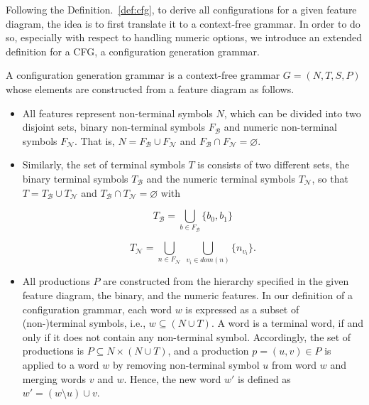 Following the Definition.~\ref{def:cfg}, to derive all configurations for a
given feature diagram, the idea is to first translate it to a context-free
grammar. In order to do so, especially with respect to handling numeric
options, we introduce an extended definition for a CFG, a configuration
generation grammar.

\begin{definition}\label{def:cgg}
A configuration generation grammar is a context-free grammar $G = (N, T, S,
P)$ whose elements are constructed from a feature diagram as follows.

\begin{itemize}
  \item All features represent non-terminal symbols $N$, which can be divided
  into two disjoint sets, binary non-terminal symbols $F_\mathcal{B}$ and
  numeric non-terminal symbols $F_\mathcal{N}$. That is, $N = F_\mathcal{B}
  \cup F_\mathcal{N}$ and $F_\mathcal{B} \cap F_\mathcal{N} = \varnothing$.

  \item Similarly, the set of terminal symbols $T$ is consists of two different
  sets, the binary terminal symbols $T_\mathcal{B}$ and the numeric terminal
  symbols $T_\mathcal{N}$, so that $T = T_\mathcal{B} \cup T_\mathcal{N}$ and
  $T_\mathcal{B} \cap T_\mathcal{N} = \varnothing$ with
  
  \begin{equation}
  T_\mathcal{B} = \bigcup_{b\in F_\mathcal{B}} \lbrace b_0,  b_1\rbrace
  \end{equation}
  
  \begin{equation}
  T_\mathcal{N} = \bigcup_{n\in F_\mathcal{N}} ~ \bigcup_{v_i \in dom(n)}
  \lbrace n_{v_i}\rbrace.
  \end{equation}
  
  \item All productions $P$ are constructed from the hierarchy specified in the
  given feature diagram, the binary, and the numeric features. In our definition
  of a configuration grammar, each word $w$ is expressed as a subset of
  (non-)terminal symbols, i.e., $w \subseteq (N \cup T)$. A word is a terminal
  word, if and only if it does not contain any non-terminal symbol. Accordingly,
  the set of productions is $P \subseteq N \times (N \cup T)$, and a production
  $p = (u, v) \in P$ is applied to a word $w$ by removing non-terminal symbol
  $u$ from word $w$ and merging words $v$ and $w$. Hence, the new word $w'$ is
  defined as $w' = (w \setminus u) \cup v$.


\end{itemize}
\end{definition}
